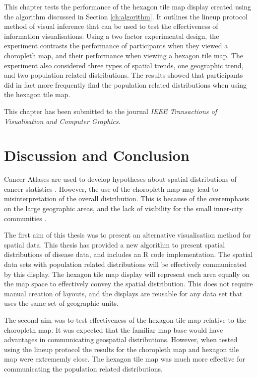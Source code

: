 \documentclass{monashthesis}
\begin{document}
This chapter tests the performance of the hexagon tile map display created using the algorithm discussed in Section \ref{ch:algorithm}.
It outlines the lineup protocol method of visual inference that can be used to test the effectiveness of information visualisations.
Using a two factor experimental design, the experiment contrasts the performance of participants when they viewed a choropleth map, and their performance when viewing a hexagon tile map.
The experiment also considered three types of spatial trends, one geographic trend, and two population related distributions.
The results showed that participants did in fact more frequently find the population related distributions when using the hexagon tile map.

This chapter has been submitted to the journal \emph{IEEE Transactions of Visualisation and Computer Graphics}.





\hypertarget{ch:conclusion}{%
\chapter{Discussion and Conclusion}\label{ch:conclusion}}

Cancer Atlases are used to develop hypotheses about spatial distributions of cancer statistics \autocite{CPISACA}. However, the use of the choropleth map may lead to misinterpretation of the overall distribution. This is because of the overemphasis on the large geographic areas, and the lack of visibility for the small inner-city communities \autocite{ACTUC}.

The first aim of this thesis was to present an alternative visualisation method for spatial data. This thesis has provided a new algorithm to present spatial distributions of disease data, and includes an R code \autocite{R} implementation. The spatial data sets with population related distributions will be effectively communicated by this display. The hexagon tile map display will represent each area equally on the map space to effectively convey the spatial distribution. This does not require manual creation of layouts, and the displays are reusable for any data set that uses the same set of geographic units.

The second aim was to test effectiveness of the hexagon tile map relative to the choropleth map. It was expected that the familiar map base would have advantages in communicating geospatial distributions. However, when tested using the lineup protocol the results for the choropleth map and hexagon tile map were extrememly close. The hexagon tile map was much more effective for communicating the population related distributions.
\end{document}
